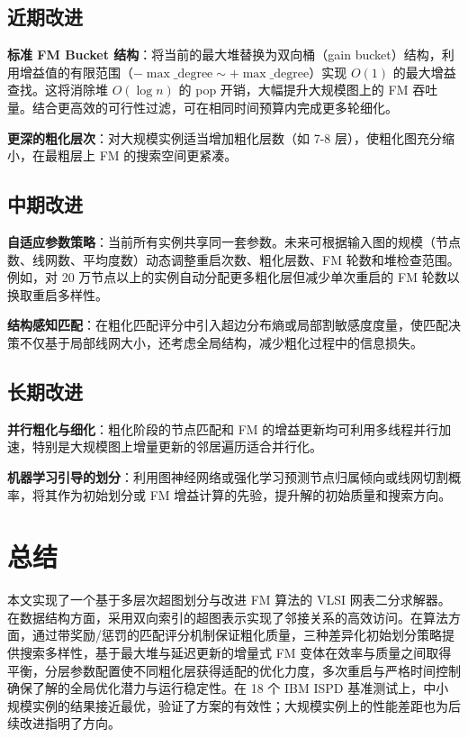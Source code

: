 \documentclass[journal, twocolumn]{IEEEtran}
\begin{document}
\subsection{近期改进}

\textbf{标准 FM Bucket 结构}：将当前的最大堆替换为双向桶（gain bucket）结构，利用增益值的有限范围（$-\max\_\text{degree} \sim +\max\_\text{degree}$）实现 $O(1)$ 的最大增益查找。这将消除堆 $O(\log n)$ 的 pop 开销，大幅提升大规模图上的 FM 吞吐量。结合更高效的可行性过滤，可在相同时间预算内完成更多轮细化。

\textbf{更深的粗化层次}：对大规模实例适当增加粗化层数（如 7-8 层），使粗化图充分缩小，在最粗层上 FM 的搜索空间更紧凑。

\subsection{中期改进}

\textbf{自适应参数策略}：当前所有实例共享同一套参数。未来可根据输入图的规模（节点数、线网数、平均度数）动态调整重启次数、粗化层数、FM 轮数和堆检查范围。例如，对 20 万节点以上的实例自动分配更多粗化层但减少单次重启的 FM 轮数以换取重启多样性。

\textbf{结构感知匹配}：在粗化匹配评分中引入超边分布熵或局部割敏感度度量，使匹配决策不仅基于局部线网大小，还考虑全局结构，减少粗化过程中的信息损失。

\subsection{长期改进}

\textbf{并行粗化与细化}：粗化阶段的节点匹配和 FM 的增益更新均可利用多线程并行加速，特别是大规模图上增量更新的邻居遍历适合并行化。

\textbf{机器学习引导的划分}：利用图神经网络或强化学习预测节点归属倾向或线网切割概率，将其作为初始划分或 FM 增益计算的先验，提升解的初始质量和搜索方向。

\section{总结}

本文实现了一个基于多层次超图划分与改进 FM 算法的 VLSI 网表二分求解器。在数据结构方面，采用双向索引的超图表示实现了邻接关系的高效访问。在算法方面，通过带奖励/惩罚的匹配评分机制保证粗化质量，三种差异化初始划分策略提供搜索多样性，基于最大堆与延迟更新的增量式 FM 变体在效率与质量之间取得平衡，分层参数配置使不同粗化层获得适配的优化力度，多次重启与严格时间控制确保了解的全局优化潜力与运行稳定性。在 18 个 IBM ISPD 基准测试上，中小规模实例的结果接近最优，验证了方案的有效性；大规模实例上的性能差距也为后续改进指明了方向。

% 
% 
\end{document}
